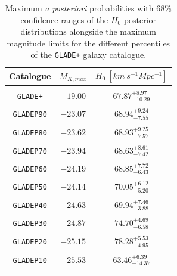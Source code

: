 \begin{table}
    \small
    \centering
    \caption[$H_0$ MAP values with $68\%$ confidence ranges, alongside the maximum magnitude limits for \texttt{GLADE+} and the different subsets.]{Maximum {\em a posteriori} probabilities with $68\%$ confidence ranges of the $H_0$ posterior distributions alongside the maximum magnitude limits for the different percentiles of the \texttt{GLADE+} galaxy catalogue.}
    \begin{tabular}{c c c }
    \hline
        \textbf{Catalogue} & $M_{K, max}$ & $H_0~[km~s^{-1}Mpc^{-1}]$ \\ \hline
        \\[-0.8em]
        \texttt{GLADE+} & $-19.00$ & $67.87^{+8.97}_{-10.29}$ \\ 
        \\[-0.8em]
        \texttt{GLADEP90} & $-23.07$ & $68.94^{+9.24}_{-7.55}$ \\
        \\[-0.8em]
        \texttt{GLADEP80} & $-23.62$ & $68.93^{+9.25}_{-7.57}$ \\
        \\[-0.8em]
        \texttt{GLADEP70} & $-23.94$ & $68.63^{+8.61}_{-7.42}$ \\
        \\[-0.8em]
        \texttt{GLADEP60} & $-24.19$ & $68.85^{+7.72}_{-6.43}$ \\
        \\[-0.8em]
        \texttt{GLADEP50} & $-24.14$ & $70.05^{+6.12}_{-5.20}$ \\
        \\[-0.8em]
        \texttt{GLADEP40} & $-24.63$ & $69.94^{+7.46}_{-3.88}$ \\
        \\[-0.8em]
        \texttt{GLADEP30} & $-24.87$ & $74.70^{+4.69}_{-6.58}$ \\
        \\[-0.8em]
        \texttt{GLADEP20} & $-25.15$ & $78.28^{+5.53}_{-4.95}$ \\
        \\[-0.8em]
        \texttt{GLADEP10} & $-25.53$ & $63.46^{+6.39}_{-14.37}$ \\ 
        \\[-0.8em]
        \hline
    \end{tabular}
    \label{tab:h0_stats}
\end{table}

